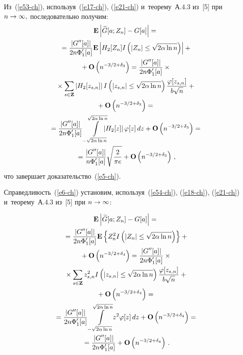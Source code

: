 \begin{multicols}{2}
 Из~(\ref{e53-ch}), используя~(\ref{e17-ch}), (\ref{e21-ch}) 
 и~теорему~А.4.3 из~[5] при $n\hm\to\infty,$  последовательно получим:
 \begin{multline*}
 \mathbf{E}\left|\widehat{G}[a;Z_n]-G[a]\right|={}\\
 {}=\fr{|G''[a]|}{2n\Phi'_1 [a]}
  \mathbf{E}\left|H_2[Z_n]
   I\left(|Z_n|\le \sqrt{2\alpha\ln n} \right)\right|
    +{}\\
    {}+ \mathbf{O}\left( {n^{- 3/2+\delta_3} } \right)=
    \fr{|G''[a]|}{2n\Phi'_1 [a]} \times{}\\
    {}\times
    \sum\limits_{s\in \mathbf{Z}}
   \left|H_2[z_{s,n}] \right|  I\left(|z_{s,n}|\le \sqrt{2\alpha\ln n} \right)
   \fr{\varphi[z_{s,n}]}{b\sqrt{n}}
    + {}\\
    {}+\mathbf{O}\left( {n^{- 3/2+\delta_3} } \right)={}
    \\ 
{}   =\fr{|G''[a]|}{2n\Phi'_1 [a]}
   \int\limits_{-\sqrt{2\alpha\ln n} }^{\sqrt{2\alpha\ln n}}\hspace*{-3mm}
   \left|H_2[z] \right| \varphi[z]\, dz
   + \mathbf{O}\left( {n^{- 3/2+\delta_3} } \right)
   ={}\\
   {}=\fr{|G''[a]|}{n\Phi'_1 [a]}\sqrt{\fr{2}{\pi e}}
    + \mathbf{O}\left( {n^{- 3/2+\delta_3} } \right)\,,
  \end{multline*}
   что завершает доказательство~(\ref{e5-ch}).
   

   Справедливость~(\ref{e6-ch}) установим, используя~(\ref{e54-ch}), 
   (\ref{e18-ch}), (\ref{e21-ch}) и~теорему~А.4.3 из~[5]
   при $n\hm\to\infty$:
   
   \noindent
  \begin{multline*}
  \mathbf{E}\left|\widetilde{G}[a;Z_n]-G[a]\right|={}\\
  {}=\displaystyle\frac{\displaystyle |G''[a]|\mathstrut}{\displaystyle 2n\Phi'_1 [a]\mathstrut}
   \mathbf{E}\left\{Z_n^2 I\left(|Z_n|\le \sqrt{2\alpha\ln n} \right)\right\}
   + {}\\
   {}+\mathbf{O}\left( {n^{- 3/2+\delta_4} } \right)=
   \displaystyle\frac{\displaystyle |G''[a]|\mathstrut}{\displaystyle 2n\Phi'_1 [a]\mathstrut}\times{}\\
   {}\times
    \sum\limits_{s\in \mathbf{Z}}
   z_{s,n}^2 I\left(|z_{s,n}|\le \sqrt{2\alpha\ln n} \right)
   \displaystyle\frac{\displaystyle \varphi[z_{s,n}]\mathstrut}{\displaystyle b\sqrt{n}\mathstrut}
    + {}\\
    {}+\mathbf{O}\left( {n^{- 3/2+\delta_4} } \right)={}
  \\
{}=\displaystyle\frac{\displaystyle |G''[a]|\mathstrut}{\displaystyle 2n\Phi'_1 [a]\mathstrut}
   \int\limits_{-\sqrt{2\alpha\ln n}}^{\sqrt{2\alpha\ln n}}\hspace*{-1mm}
   z^2 \varphi[z]\, dz
   + \mathbf{O}\left( {n^{- 3/2+\delta_4} } \right)
  ={}\\
  {}=\displaystyle\frac{\displaystyle |G''[a]|\mathstrut}{\displaystyle 2n\Phi'_1 [a]\mathstrut}
    +\mathbf{O}\left( {n^{- 3/2+\delta_4} } \right)\,.
  \end{multline*}


\end{multicols}
